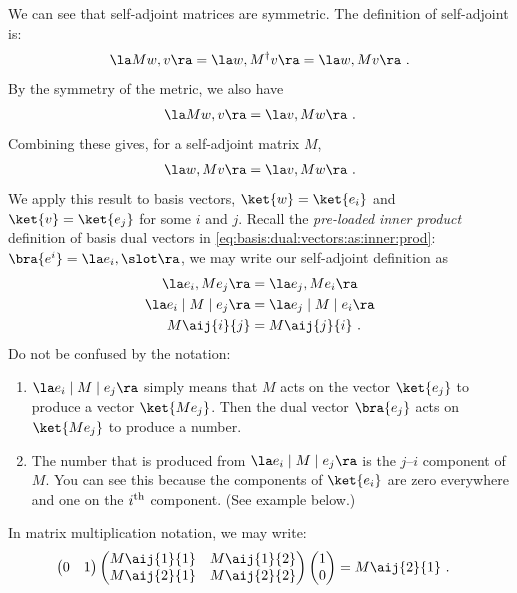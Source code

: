 We can see that self-adjoint matrices are symmetric. The definition of self-adjoint is:
\begin{align}
    \la M w, v \ra = \la w, M^\dag v \ra = \la w, M v \ra \ .
\end{align}
By the symmetry of the metric, we also have 
\begin{align}
    \la M w, v \ra = \la v, Mw \ra \ .
\end{align}
Combining these gives, for a self-adjoint matrix $M$,
\begin{align}
    \la w, M v \ra = \la v, Mw \ra \ .
\end{align}
We apply this result to basis vectors, $\ket{w} = \ket{e_i}$ and $\ket{v} = \ket{e_j}$ for some $i$ and $j$. Recall the \emph{pre-loaded inner product} definition of basis dual vectors in \eqref{eq:basis:dual:vectors:as:inner:prod}: $\bra{e^i} = \la e_i, \slot \ra$, we may write our self-adjoint definition as 
\begin{align}
    \la e_i,  Me_j \ra &= \la e_j, M e_i \ra \\
    \la e_i \mid M \mid e_j \ra &= \la e_j \mid M \mid e_i\ra\\
    M\aij{i}{j} &= M\aij{j}{i}
    \ .
    \label{eq:self:adjoint:is:symmetric}
\end{align}
Do not be confused by the notation: 
\begin{enumerate}
    \item $\la e_i \mid M \mid e_j \ra$ simply means that $M$ acts on the vector $\ket{e_j}$ to produce a vector $\ket{Me_j}$. Then the dual vector $\bra{e_j}$ acts on $\ket{Me_j}$ to produce a number.
    \item The number that is produced from $\la e_i \mid M \mid e_j \ra$ is the $j$--$i$ component of $M$. You can see this because the components of $\ket{e_i}$ are zero everywhere and one on the $i^\textnormal{th}$ component. (See example below.)
\end{enumerate}

\begin{example}
In matrix multiplication notation, we may write:
\begin{align}
    \begin{pmatrix}
        0 & 1
    \end{pmatrix}
    \begin{pmatrix}
        M\aij{1}{1} & M\aij{1}{2}\\
        M\aij{2}{1} & M\aij{2}{2}
    \end{pmatrix}
    \begin{pmatrix}
        1 \\ 0
    \end{pmatrix}
    &= 
    M\aij{2}{1} \ .
\end{align}
\end{example}

